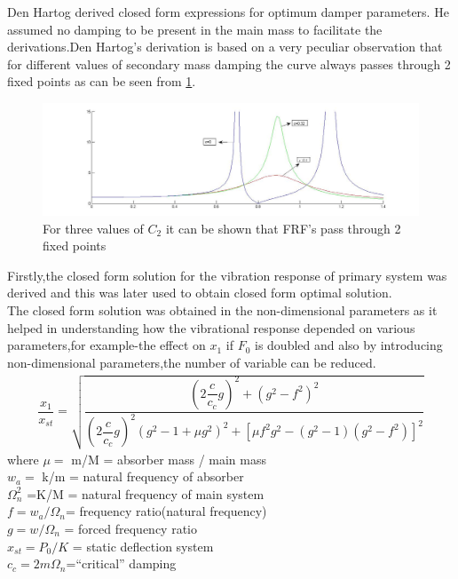 Den Hartog derived closed form expressions for optimum damper parameters. He assumed no damping to be present in the main mass to facilitate the derivations.Den Hartog’s derivation is based on a very peculiar observation that for different values of secondary mass damping the curve always passes through 2 fixed points as can be seen from \ref{fig:4}.
\begin{figure}[h]
\includegraphics[width=\textwidth,height=0.5\textwidth]{"figures/4"}
\caption{For three values of $C_{2}$ it can be shown that FRF's pass through 2 fixed points}
  \label{fig:4}
\end{figure}
Firstly,the closed form solution for the vibration response of  primary system was derived and this was later used to obtain closed form optimal solution.\\The closed form solution was obtained in the non-dimensional parameters as it helped in understanding how the vibrational response depended on various parameters,for example-the effect on $x_1$ if $F_0$ is doubled and also by introducing non-dimensional parameters,the number of variable can be reduced.
\begin{align}
\dfrac{x_1}{x_{st}} = \sqrt{\dfrac{(2\dfrac{c}{c_c}g)^2 + (g^2 - f^2)^2}{(2\dfrac{c}{c_c}g)^2 (g^2 -1 + \mu g^2)^2 + [\mu f^2 g^2 - (g^2 -1)(g^2-f^2)]^2}} 
\end{align}
where 
$\mu = $ m/M =  absorber mass / main mass \\
$w_a = $ k/m =  natural frequency of absorber \\
$\Omega_n^2 $ =K/M = natural frequency of main system\\
$f =w_a/\Omega_n$= frequency ratio(natural frequency)\\
$g = w/\Omega_n$ = forced frequency ratio \\
$x_{st} = P_0/K$ = static deflection system \\
$c_c = 2m\Omega_n $=``critical''   damping\\

